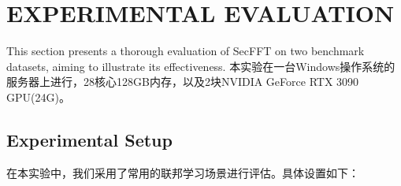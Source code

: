 \documentclass[lettersize,journal]{IEEEtran}
\begin{document}





\section{EXPERIMENTAL EVALUATION}

This section presents a thorough evaluation of SecFFT on two benchmark datasets, aiming to illustrate its effectiveness. 本实验在一台Windows操作系统的服务器上进行，28核心128GB内存，以及2块NVIDIA GeForce RTX 3090 GPU(24G)。

\subsection{Experimental Setup}

在本实验中，我们采用了常用的联邦学习场景进行评估。具体设置如下：
\end{document}
